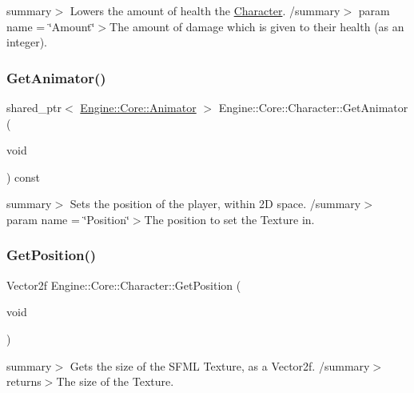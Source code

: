 summary$>$ Lowers the amount of health the \hyperlink{class_engine_1_1_core_1_1_character}{Character}. /summary$>$ param name = \char`\"{}\+Amount\char`\"{}$>$The amount of damage which is given to their health (as an integer).\mbox{\label{class_engine_1_1_core_1_1_character_abcc0ba87be08fa12740a260cdd2d9adc}} 
\subsubsection{\texorpdfstring{Get\+Animator()}{GetAnimator()}}
{\footnotesize\ttfamily shared\+\_\+ptr$<$ \hyperlink{class_engine_1_1_core_1_1_animator}{Engine\+::\+Core\+::\+Animator} $>$ Engine\+::\+Core\+::\+Character\+::\+Get\+Animator (\begin{DoxyParamCaption}\item[{void}]{ }\end{DoxyParamCaption}) const}

summary$>$ Sets the position of the player, within 2D space. /summary$>$ param name = \char`\"{}\+Position\char`\"{}$>$The position to set the Texture in.\mbox{\label{class_engine_1_1_core_1_1_character_aea290308ddc56ab784c87f85e6b7f254}} 
\subsubsection{\texorpdfstring{Get\+Position()}{GetPosition()}}
{\footnotesize\ttfamily Vector2f Engine\+::\+Core\+::\+Character\+::\+Get\+Position (\begin{DoxyParamCaption}\item[{void}]{ }\end{DoxyParamCaption})}

summary$>$ Gets the size of the S\+F\+ML Texture, as a Vector2f. /summary$>$ returns$>$The size of the Texture.\mbox{\label{class_engine_1_1_core_1_1_character_a3465481aed27d24909b8e40577f09b10}} 
